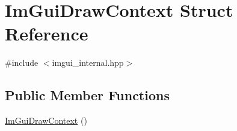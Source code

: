 \hypertarget{struct_im_gui_draw_context}{}\section{Im\+Gui\+Draw\+Context Struct Reference}
\label{struct_im_gui_draw_context}


{\ttfamily \#include $<$imgui\+\_\+internal.\+hpp$>$}

\subsection*{Public Member Functions}
\begin{DoxyCompactItemize}
\item 
\hyperlink{struct_im_gui_draw_context_a0bd8a456860aee49497c58c82a01600c}{Im\+Gui\+Draw\+Context} ()
\end{DoxyCompactItemize}
